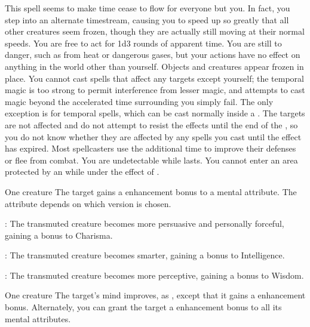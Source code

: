 \spellline
\spelleffect This spell seems to make time cease to flow for everyone but you. In fact, you step into an alternate timestream, causing you to speed up so greatly that all other creatures seem frozen, though they are actually still moving at their normal speeds. You are free to act for 1d3 rounds of apparent time. You are still \vulnerable to danger, such as from heat or dangerous gases, but your actions have no effect on anything in the world other than yourself. Objects and creatures appear frozen in place. You cannot cast spells that affect any targets except yourself; the temporal magic is too strong to permit interference from lesser magic, and attempts to cast magic beyond the accelerated time surrounding you simply fail. The only exception is for temporal spells, which can be cast normally inside a . The targets are not affected and do not attempt to resist the effects until the end of the , so you do not know whether they are affected by any spells you cast until the effect has expired.
\spellnotes Most spellcasters use the additional time to improve their defenses or flee from combat. You are undetectable while  lasts. You cannot enter an area protected by an  while under the effect of .

\spellrng{\rngtouch}
\spelldur{\durshort}
\begin{spelltarget}{One creature}
    \spelleffect The target gains a  enhancement bonus to a mental attribute. The attribute depends on which version is chosen.
    \par {}: The transmuted creature becomes more persuasive and personally forceful, gaining a bonus to Charisma.
    \par {}: The transmuted creature becomes smarter, gaining a bonus to Intelligence.
    \par {}: The transmuted creature becomes more perceptive, gaining a bonus to Wisdom.
\end{spelltarget}

\spellrng{\rngtouch}
\spelldur{\durshort}
\begin{spelltarget}{One creature}
    \spelleffect The target's mind improves, as , except that it gains a  enhancement bonus. Alternately, you can grant the target a  enhancement bonus to all its mental attributes.
\end{spelltarget}

